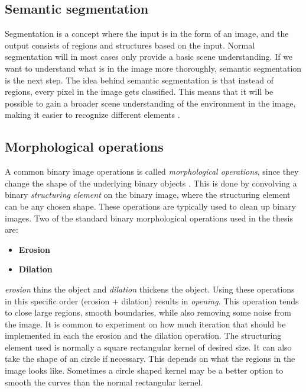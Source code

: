 \documentclass[USenglish]{ifimaster}  %
\begin{document}
\subsection{Semantic segmentation}
Segmentation is a concept where the input is in the form of an image, and the output consists of regions and structures based on the input. Normal segmentation will in most cases only provide a basic scene understanding. If we want to understand what is in the image more thoroughly, semantic segmentation is the next step. The idea behind semantic segmentation is that instead of regions, every pixel in the image gets classified. This means that it will be possible to gain a broader scene understanding of the environment in the image, making it easier to recognize different elements \cite{website:semantic_segmentation}.

\subsection{Morphological operations}
A common binary image operations is called \textit{morphological operations}, since
they change the shape of the underlying binary objects \cite{Ritter}. This is done by convolving a binary \textit{structuring element} on the binary image, where the structuring element can be any chosen shape. These operations are typically used to clean up binary images. Two of the standard binary morphological operations used in the thesis are: 
\newline
\begin{itemize}
    \item \textbf{Erosion}
    \item \textbf{Dilation}
\end{itemize}

\textit{erosion} thins the object and \textit{dilation} thickens the object. Using these operations in this specific order (erosion + dilation) results in \textit{opening}. This operation tends to close large regions, smooth boundaries, while also removing some noise from the image. It is common to experiment on how much iteration that should be implemented in each the erosion and the dilation operation.
\newline
\newline
The structuring element used is normally a square rectangular kernel of desired size. It can also take the shape of an circle if necessary. This depends on what the regions in the image looks like. Sometimes a circle shaped kernel may be a better option to smooth the curves than the normal rectangular kernel.
\end{document}
